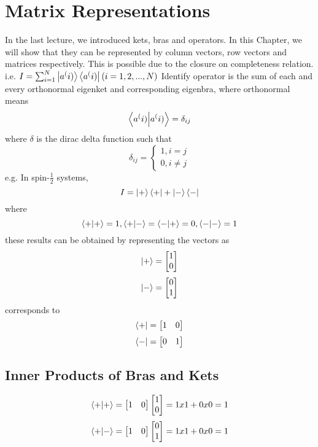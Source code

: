 \documentclass{book}
\begin{document}
\chapter{Matrix Representations}
In the last lecture, we introduced kets, bras and operators. In this Chapter, we will show that they can be represented by column vectors, row vectors and matrices respectively. This is possible due to the closure on completeness relation. 
i.e. $I = \sum^N_{i=1} \ket{a^(i)} \bra{a^(i)} (i=1,2,...,N)$
Identify operator is the sum of each and every orthonormal eigenket and corresponding eigenbra, where orthonormal means
$$ \braket{a^(i)}{a^(i)} = \delta_{ij}$$
where $\delta$ is the dirac delta function such that
$$ \delta_{ij} = 
\begin{cases}
1, i = j \\
0, i \neq j
\end{cases}
$$
e.g. In spin-$\frac{1}{2}$ systems,
$$ I = \ket{+}\bra{+} + \ket{-}\bra{-}$$
where 
$$ \braket{+}{+} = 1, \braket{+}{-} = \braket{-}{+} = 0, \braket{-}{-} = 1$$
these results can be obtained by representing the vectors as
$$\ket{+} = \begin{bmatrix} 1 \\ 0 \end{bmatrix}$$ 
$$\ket{-} = \begin{bmatrix} 0 \\ 1 \end{bmatrix} $$
corresponds to
$$ \bra{+} = \begin{bmatrix} 1 & 0 \end{bmatrix} $$
$$\bra{-} = \begin{bmatrix} 0 & 1 \end{bmatrix} $$

\section{Inner Products of Bras and Kets}
$$ \braket{+}{+} = \begin{bmatrix} 1 & 0 \end{bmatrix} \begin{bmatrix} 1 \\ 0 \end{bmatrix} = 1 x 1 + 0 x 0 = 1 $$
$$ \braket{+}{-} = \begin{bmatrix} 1 & 0 \end{bmatrix} \begin{bmatrix} 0 \\ 1 \end{bmatrix} = 1 x 1 + 0 x 0 = 1 $$
\end{document}
